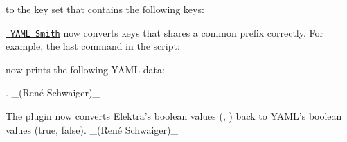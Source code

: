 to the key set that contains the following keys\+:


\begin{DoxyCode}{0}
\end{DoxyCode}



\begin{DoxyItemize}
\item \href{https://www.libelektra.org/plugins/yamlsmith}{\texttt{ Y\+A\+ML Smith}} now converts keys that shares a common prefix correctly. For example, the last command in the script\+:
\end{DoxyItemize}


\begin{DoxyCode}{0}
\end{DoxyCode}


now prints the following Y\+A\+ML data\+:


\begin{DoxyCode}{0}
\end{DoxyCode}


. \+\_\+(René Schwaiger)\+\_\+


\begin{DoxyItemize}
\item The plugin now converts Elektra’s boolean values ({}, {}) back to Y\+A\+M\+L’s boolean values ({\ttfamily true}, {\ttfamily false}). \+\_\+(René Schwaiger)\+\_\+
\end{DoxyItemize}


